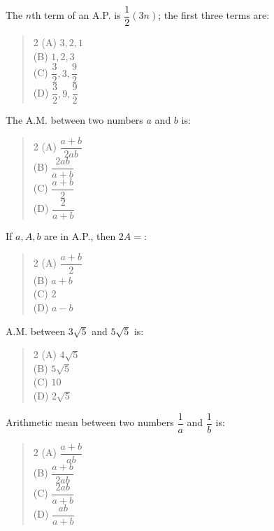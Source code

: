 \documentclass[11pt,a4paper]{article}
\begin{document}
\begin{mcqlist}
\item The $n$th term of an A.P. is $\dfrac{1}{2}(3n)$; the first three terms are:
\begin{quote}\begin{multicols}{2}
\noindent (A) $3,2,1$ \\
(B) $1,2,3$ \\
(C) $\dfrac{3}{2},3,\dfrac{9}{2}$ \\
(D) $\dfrac{3}{2},9,\dfrac{9}{2}$
\end{multicols}\end{quote}

\item The A.M. between two numbers $a$ and $b$ is:
\begin{quote}\begin{multicols}{2}
\noindent (A) $\dfrac{a+b}{2ab}$ \\
(B) $\dfrac{2ab}{a+b}$ \\
(C) $\dfrac{a+b}{2}$ \\
(D) $\dfrac{2}{a+b}$
\end{multicols}\end{quote}

\item If $a,A,b$ are in A.P., then $2A=$:
\begin{quote}\begin{multicols}{2}
\noindent (A) $\dfrac{a+b}{2}$ \\
(B) $a+b$ \\
(C) $2$ \\
(D) $a-b$
\end{multicols}\end{quote}

\item A.M. between $3\sqrt5$ and $5\sqrt5$ is:
\begin{quote}\begin{multicols}{2}
\noindent (A) $4\sqrt5$ \\
(B) $5\sqrt5$ \\
(C) $10$ \\
(D) $2\sqrt5$
\end{multicols}\end{quote}

\item Arithmetic mean between two numbers $\dfrac{1}{a}$ and $\dfrac{1}{b}$ is:
\begin{quote}\begin{multicols}{2}
\noindent (A) $\dfrac{a+b}{ab}$ \\
(B) $\dfrac{a+b}{2ab}$ \\
(C) $\dfrac{2ab}{a+b}$ \\
(D) $\dfrac{ab}{a+b}$
\end{multicols}\end{quote}


\end{mcqlist}
\end{document}

